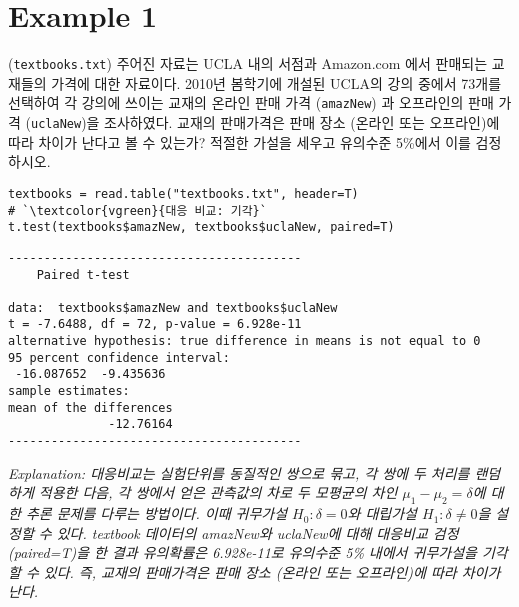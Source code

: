 \documentclass{article}
\begin{document}
\pagestyle{fancy}

\section*{Example 1}
(\texttt{textbooks.txt}) 주어진 자료는 UCLA 내의 서점과 Amazon.com 에서 판매되는 교재들의 가격에 대한 자료이다. 2010년 봄학기에 개설된 UCLA의 강의 중에서 73개를 선택하여
각 강의에 쓰이는 교재의 온라인 판매 가격 (\texttt{amazNew}) 과 오프라인의 판매 가격 (\texttt{uclaNew})을
조사하였다. 교재의 판매가격은 판매 장소 (온라인 또는 오프라인)에 따라 차이가 난다고 볼 수 있는가? 적절한 가설을 세우고 유의수준 5\%에서 이를 검정하시오.
\begin{lstlisting}[style={r-style}]
textbooks = read.table("textbooks.txt", header=T)
# `\textcolor{vgreen}{대응 비교: 기각}`
t.test(textbooks$amazNew, textbooks$uclaNew, paired=T)
\end{lstlisting}
\begin{lstlisting}[style={out-style}]
-----------------------------------------
	Paired t-test

data:  textbooks$amazNew and textbooks$uclaNew
t = -7.6488, df = 72, p-value = 6.928e-11
alternative hypothesis: true difference in means is not equal to 0
95 percent confidence interval:
 -16.087652  -9.435636
sample estimates:
mean of the differences 
              -12.76164 
-----------------------------------------
\end{lstlisting}
\emph{Explanation: 대응비교는 실험단위를 동질적인 쌍으로 묶고, 각 쌍에 두 처리를 랜덤하게 적용한 다음, 각 쌍에서
얻은 관측값의 차로 두 모평균의 차인 $\mu_1-\mu_2=\delta$에 대한 추론 문제를 다루는 방법이다. 이때 귀무가설 $H_0: \delta=0$와 대립가설 $H_1: \delta\neq0$을 설정할 수 있다. textbook 데이터의 amazNew와 uclaNew에 대해 대응비교 검정 (paired=T)을 한 결과 유의확률은 6.928e-11로 유의수준 5\% 내에서 귀무가설을 기각할 수 있다. 즉, 교재의 판매가격은 판매 장소 (온라인 또는 오프라인)에 따라 차이가 난다.} \\
\end{document}
